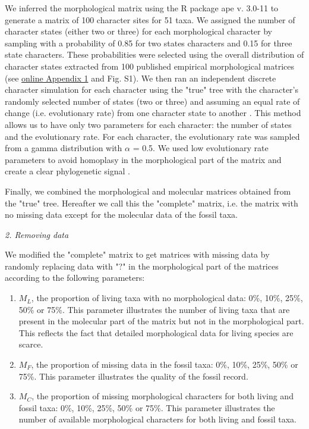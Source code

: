 \documentclass[12pt,letterpaper]{article}
\renewcommand{\subsection}[1]{%
\bigskip
\begin{center}
\begin{large}
\normalfont\itshape #1
\end{large}
\end{center}}
\begin{document}
We inferred the morphological matrix using the R package ape v. 3.0-11 \citep{paradisape:2004} to generate a matrix of 100 character sites for 51 taxa. We assigned the number of character states (either two or three) for each morphological character by sampling with a probability of 0.85 for two states characters and 0.15 for three state characters. These probabilities were selected using the overall distribution of character states extracted from 100 published empirical morphological matrices (see \hyperref[SupplementaryMaterial]{online Appendix 1} and Fig. S1). We then ran an independent discrete character simulation for each character using the "true" tree with the character's randomly selected number of states (two or three) and assuming an equal rate of change (i.e. evolutionary rate) from one character state to another \citep{Pagel22011994}. This method allows us to have only two parameters for each character: the number of states and the evolutionary rate. For each character, the evolutionary rate was sampled from a gamma distribution with $\alpha$ = 0.5. We used low evolutionary rate parameters to avoid homoplasy in the morphological part of the matrix and create a clear phylogenetic signal \citep{wagner2000,davalosintegrating2014,wrightbayesian2014}.

Finally, we combined the morphological and molecular matrices obtained from the "true" tree. Hereafter we call this the "complete" matrix, i.e. the matrix with no missing data except for the molecular data of the fossil taxa.


\subsection{2. Removing data}
\label{Removing_data}
We modified the "complete" matrix to get matrices with missing data by randomly replacing data with "?" in the morphological part of the matrices according to the following parameters:

\begin{enumerate}
\item{$M_{L}$, the proportion of living taxa with no morphological data: 0\%, 10\%, 25\%, 50\% or 75\%.}
This parameter illustrates the number of living taxa that are present in the molecular part of the matrix but not in the morphological part. This reflects the fact that detailed morphological data for living species are scarce.
\item{$M_{F}$, the proportion of missing data in the fossil taxa: 0\%, 10\%, 25\%, 50\% or 75\%.}
This parameter illustrates the quality of the fossil record. 
\item{$M_{C}$, the proportion of missing morphological characters for both living and fossil taxa: 0\%, 10\%, 25\%, 50\% or 75\%. }
This parameter illustrates the number of available morphological characters for both living and fossil taxa.
\end{enumerate}
\end{document}
